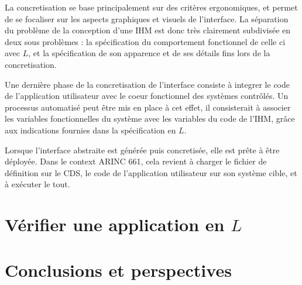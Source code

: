 \documentclass{ihm}
\begin{document}
La concretisation se base principalement sur des critères
ergonomiques, et permet de se focaliser sur les aspects
graphiques et visuels de l'interface. La séparation du problème
de la conception d'une IHM est donc très clairement subdivisée
en deux sous problèmes : la spécification du comportement
fonctionnel de celle ci avec $L$, et la spécification de son
apparence et de ses détails fins lors de la concretisation.

Une dernière phase de la concretisation de l'interface consiste
à integrer le code de l'application utilisateur avec le coeur
fonctionnel des systèmes contrôlés. Un processus automatisé peut
être mis en place à cet effet, il consisterait à associer les
variables fonctionnelles du système avec les variables du code
de l'IHM, grâce aux indications fournies dans la spécification
en $L$.

Lorsque l'interface abstraite est générée puis concretisée, elle
est prête à être déployée. Dans le context ARINC 661, cela
revient à charger le fichier de définition sur le CDS, le code
de l'application utilisateur sur son système cible, et à
exécuter le tout.




\section{Vérifier une application en $L$}
\label{sec:verif}

\section{Conclusions et perspectives}
\label{sec:conclusion}


\small


\end{document}
